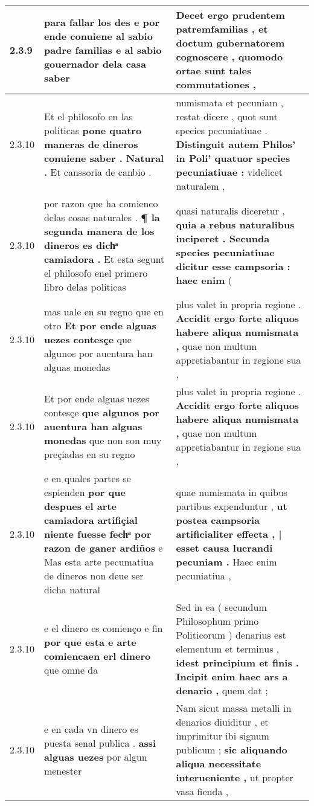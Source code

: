 \begin{tabular}{|p{1cm}|p{6.5cm}|p{6.5cm}|}
2.3.9 & para fallar los des e por ende conuiene al sabio padre familias \textbf{ e al sabio gouernador dela casa } saber & Decet ergo prudentem patremfamilias , \textbf{ et doctum gubernatorem cognoscere , } quomodo ortae sunt tales commutationes , \\\hline
2.3.10 & Et el philosofo en las politicas \textbf{ pone quatro maneras de dineros conuiene saber . Natural . } Et canssoria de canbio . & numismata et pecuniam , restat dicere , quot sunt species pecuniatiuae . \textbf{ Distinguit autem Philos’ in Poli’ quatuor species pecuniatiuae : } videlicet naturalem , \\\hline
2.3.10 & por razon que ha comienco delas cosas naturales . \textbf{ ¶ la segunda manera de los dineros es dichͣ camiadora . } Et esta segunt el philosofo enel primero libro delas politicas & quasi naturalis diceretur , \textbf{ quia a rebus naturalibus inciperet . Secunda species pecuniatiuae dicitur esse campsoria : haec enim } ( \\\hline
2.3.10 & mas uale en su regno que en otro \textbf{ Et por ende alguas uezes contesçe } que algunos por auentura han alguas monedas & plus valet in propria regione . \textbf{ Accidit ergo forte aliquos habere aliqua numismata , } quae non multum appretiabantur in regione sua , \\\hline
2.3.10 & Et por ende alguas uezes contesçe \textbf{ que algunos por auentura han alguas monedas } que non son muy preçiadas en su regno & plus valet in propria regione . \textbf{ Accidit ergo forte aliquos habere aliqua numismata , } quae non multum appretiabantur in regione sua , \\\hline
2.3.10 & e en quales partes se espienden \textbf{ por que despues el arte camiadora artifiçial niente fuesse fechͣ por razon de ganer ardiños } e Mas esta arte pecumatiua de dineros non deue ser dicha natural & quae numismata in quibus partibus expenduntur , \textbf{ ut postea campsoria artificialiter effecta , | esset causa lucrandi pecuniam . } Haec enim pecuniatiua , \\\hline
2.3.10 & e el dinero es comienço e fin \textbf{ por que esta e arte comiencaen erl dinero } que omne da & Sed in ea ( secundum Philosophum primo Politicorum ) denarius est elementum et terminus , \textbf{ idest principium et finis . Incipit enim haec ars a denario , } quem dat ; \\\hline
2.3.10 & e en cada vn dinero es puesta senal publica . \textbf{ assi alguas uezes } por algun menester & Nam sicut massa metalli in denarios diuiditur , et imprimitur ibi signum publicum ; \textbf{ sic aliquando aliqua necessitate interueniente , } ut propter vasa fienda , \\\hline

\end{tabular}
